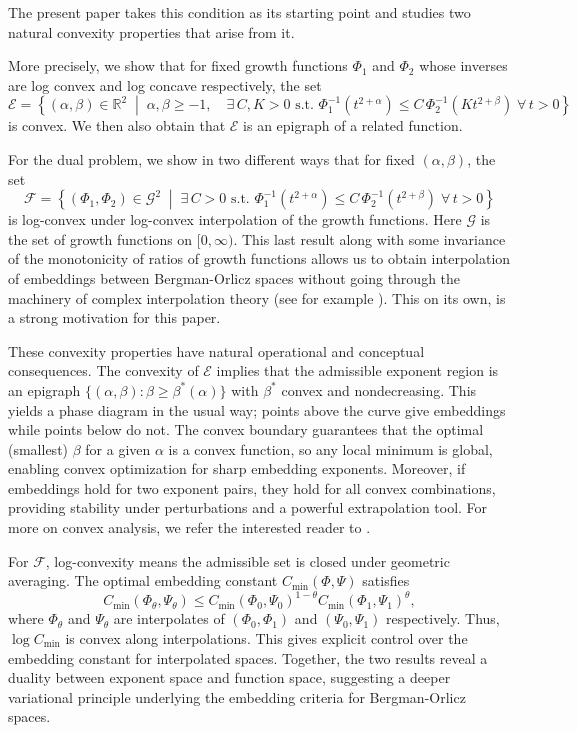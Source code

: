 \documentclass[12pt]{amsart}
\newcommand{\R}{\mathbb{R}}
\begin{document}
The present paper takes this condition as its starting point and studies two natural convexity properties that arise from it. 

More precisely, we show that for fixed growth functions $\Phi_1$ and $ \Phi_2$ whose inverses are log convex and log concave respectively, the set
\[
\mathcal{E} = \left\{ (\alpha,\beta) \in \R^2 \;\middle|\;
\alpha,\beta \ge -1,\quad
\exists\, C,K > 0 \text{ s.t. }
\Phi_1^{-1}\!\left( t^{2+\alpha} \right) \le C\,
\Phi_2^{-1}\!\left( K t^{2+\beta} \right) \;\forall\, t>0
\right\}
\]
is convex. We then also obtain that $\mathcal{E}$ is an epigraph of a related function.


For the dual problem, we show in two different ways that 
for fixed $(\alpha,\beta)$, the set
\[
\mathcal{F} = \left\{ (\Phi_1,\Phi_2) \in \mathcal{G}^2 \;\middle|\;
\exists\, C > 0 \text{ s.t. }
\Phi_1^{-1}\!\left( t^{2+\alpha} \right) \le C\,
\Phi_2^{-1}\!\left( t^{2+\beta} \right) \;\forall\, t>0
\right\}
\]
is log-convex under log-convex interpolation of the growth functions. Here $\mathcal{G}$ is the set of growth functions on $[0,\infty)$. This last result along with some invariance of the monotonicity of ratios of growth functions allows us to obtain interpolation of embeddings between Bergman-Orlicz spaces without going through the machinery of complex interpolation theory (see for example \cite{ZhuZhao}). This on its own, is a strong motivation for this paper.

\medskip
These convexity properties have natural operational and conceptual consequences. The convexity of $\mathcal{E}$ implies that the admissible exponent region is an epigraph $\{(\alpha,\beta): \beta \ge \beta^*(\alpha)\}$ with $\beta^*$ convex and nondecreasing. This yields a phase diagram in the usual way; points above the curve give embeddings while points below do not. The convex boundary guarantees that the optimal (smallest) $\beta$ for a given $\alpha$ is a convex function, so any local minimum is global, enabling convex optimization for sharp embedding exponents. Moreover, if embeddings hold for two exponent pairs, they hold for all convex combinations, providing stability under perturbations and a powerful extrapolation tool. For more on convex analysis, we refer the interested reader  to \cite{Rockafellar1970}.

For $\mathcal{F}$, log-convexity means the admissible set is closed under geometric averaging. The optimal embedding constant $C_{\min}(\Phi,\Psi)$ satisfies
\[
C_{\min}(\Phi_\theta,\Psi_\theta) \le C_{\min}(\Phi_0,\Psi_0)^{1-\theta} C_{\min}(\Phi_1,\Psi_1)^{\theta},
\]
where $\Phi_\theta$ and $\Psi_\theta$ are interpolates of $(\Phi_0,\Phi_1)$ and $(\Psi_0,\Psi_1)$ respectively. Thus, $\log C_{\min}$ is convex along interpolations. This gives explicit control over the embedding constant for interpolated spaces.  Together, the two results reveal a duality between exponent space and function space, suggesting a deeper variational principle underlying the embedding criteria for Bergman-Orlicz spaces.
\end{document}
